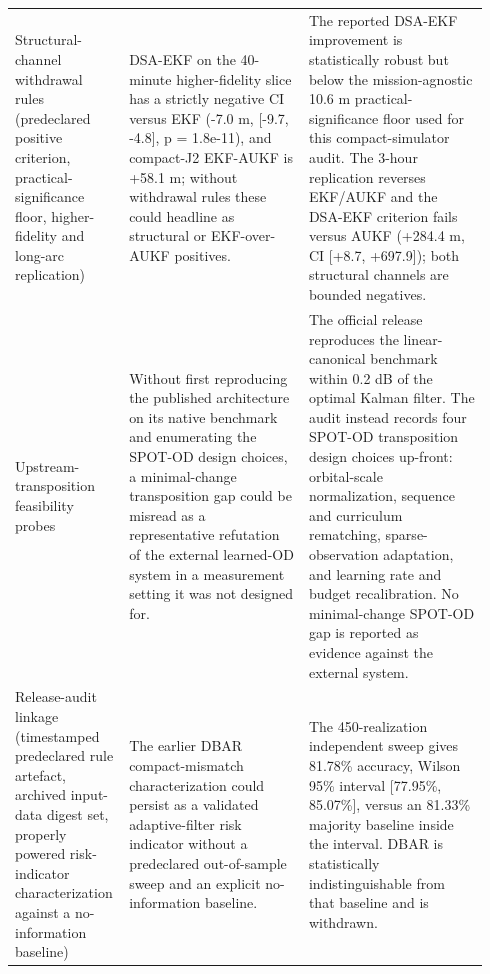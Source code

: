 \begin{table}[p]
{\begin{tabular}{@{}p{0.20\linewidth}p{0.37\linewidth}p{0.37\linewidth}@{}}
    Structural-channel withdrawal rules (predeclared positive criterion, practical-significance floor, higher-fidelity and long-arc replication) & DSA-EKF on the 40-minute higher-fidelity slice has a strictly negative CI versus EKF (-7.0 m, [-9.7, -4.8], p = 1.8e-11), and compact-J2 EKF-AUKF is +58.1 m; without withdrawal rules these could headline as structural or EKF-over-AUKF positives. & The reported DSA-EKF improvement is statistically robust but below the mission-agnostic 10.6 m \mbox{practical-significance} floor used for this compact-simulator audit. The 3-hour replication reverses EKF/AUKF and the DSA-EKF criterion fails versus AUKF (+284.4 m, CI [+8.7, +697.9]); both structural channels are bounded negatives. \\
    Upstream-transposition feasibility probes & Without first reproducing the published architecture on its native benchmark and enumerating the SPOT-OD design choices, a minimal-change transposition gap could be misread as a representative refutation of the external learned-OD system in a measurement setting it was not designed for. & The official release reproduces the linear-canonical benchmark within 0.2 dB of the optimal Kalman filter. The audit instead records four SPOT-OD transposition design choices up-front: orbital-scale normalization, sequence and curriculum rematching, sparse-observation adaptation, and learning rate and budget recalibration. No minimal-change SPOT-OD gap is reported as evidence against the external system. \\
    Release-audit linkage (timestamped predeclared rule artefact, archived input-data digest set, properly powered risk-indicator characterization against a no-information baseline) & The earlier DBAR compact-mismatch characterization could persist as a validated adaptive-filter risk indicator without a predeclared out-of-sample sweep and an explicit no-information baseline. & The 450-realization independent sweep gives 81.78\% accuracy, Wilson 95\% interval [77.95\%, 85.07\%], versus an 81.33\% majority baseline inside the interval. DBAR is statistically indistinguishable from that baseline and is withdrawn. \\
    \bottomrule
  \end{tabular}
  }
  \par\vspace{2pt}{\scriptsize Retrospective sufficiency diagnostic on the seven-ingredient claim-audit self-audit record. The inventory demonstrates that the composition is non-redundant on the evidence already in the manuscript; it does not establish individual necessity of each ingredient.}
\end{table}